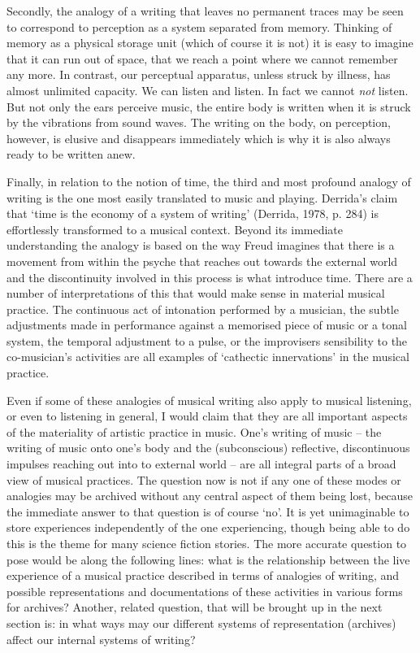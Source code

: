 Secondly, the analogy of a writing that leaves no permanent traces may
be seen to correspond to perception as a system separated from memory.
Thinking of memory as a physical storage unit (which of course it is
not) it is easy to imagine that it can run out of space, that we reach a
point where we cannot remember any more. In contrast, our perceptual
apparatus, unless struck by illness, has almost unlimited capacity. We
can listen and listen. In fact we cannot \emph{not} listen. But not only
the ears perceive music, the entire body is written when it is struck by
the vibrations from sound waves. The writing on the body, on perception,
however, is elusive and disappears immediately which is why it is also
always ready to be written anew.

Finally, in relation to the notion of time, the third and most profound
analogy of writing is the one most easily translated to music and
playing. Derrida's claim that `time is the economy of a system of
writing' (Derrida, 1978, p. 284) is effortlessly transformed to a
musical context. Beyond its immediate understanding the analogy is based
on the way Freud imagines that there is a movement from within the
psyche that reaches out towards the external world and the discontinuity
involved in this process is what introduce time. There are a number of
interpretations of this that would make sense in material musical
practice. The continuous act of intonation performed by a musician, the
subtle adjustments made in performance against a memorised piece of
music or a tonal system, the temporal adjustment to a pulse, or the
improvisers sensibility to the co-musician's activities are all examples
of `cathectic innervations' in the musical practice.

Even if some of these analogies of musical writing also apply to musical
listening, or even to listening in general, I would claim that they are
all important aspects of the materiality of artistic practice in music.
One's writing of music -- the writing of music onto one's body and the
(subconscious) reflective, discontinuous impulses reaching out into to
external world -- are all integral parts of a broad view of musical
practices. The question now is not if any one of these modes or
analogies may be archived without any central aspect of them being lost,
because the immediate answer to that question is of course `no'. It is
yet unimaginable to store experiences independently of the one
experiencing, though being able to do this is the theme for many science
fiction stories. The more accurate question to pose would be along the
following lines: what is the relationship between the live experience of
a musical practice described in terms of analogies of writing, and
possible representations and documentations of these activities in
various forms for archives? Another, related question, that will be
brought up in the next section is: in what ways may our different
systems of representation (archives) affect our internal systems of
writing?

